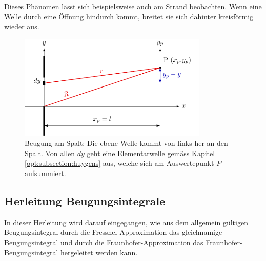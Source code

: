 Dieses Phänomen lässt sich beispielsweise auch am Strand beobachten. 
Wenn eine Welle durch eine Öffnung hindurch kommt, breitet sie sich dahinter kreisförmig wieder aus.

\begin{figure}
    \centering
    \includegraphics[width=90mm]{papers/opt/images/derivation.pdf}
    \caption{Beugung am Spalt: Die ebene Welle kommt von links her an den Spalt. 
    Von allen $dy$ geht eine Elementarwelle gemäss Kapitel \ref{opt:subsection:huygens} aus, welche sich am Auswertepunkt $P$ aufsummiert.}
    \label{opt:fig:geometricalShape}
\end{figure}

\subsection{Herleitung Beugungsintegrale}
In dieser Herleitung wird darauf eingegangen, wie aus dem allgemein gültigen Beugungsintegral durch die Fressnel-Approximation 
das gleichnamige Beugungsintegral und durch die Fraunhofer-Approximation das Fraunhofer-Beugungsintegral hergeleitet werden kann.

